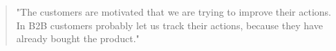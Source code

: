 \documentclass[english]{tktltiki2}
\theoremstyle{definition}
\theoremstyle{remark}
\begin{document}
\begin{quote}
"The customers are motivated that we are trying to improve their actions. In B2B customers probably let us track their actions, because they have already bought the product."
\end{quote}


\end{document}
